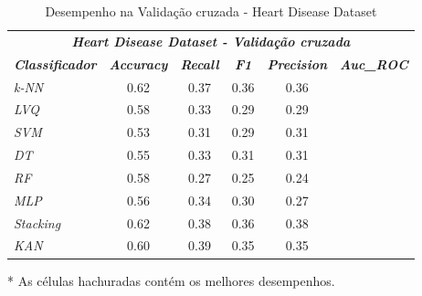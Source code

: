 \documentclass[journal]{IEEEtran}
\begin{document}
\begin{table}[h!]
	\caption{Desempenho na Validação cruzada - Heart Disease Dataset}
	\label{tab:23}
	\begin{threeparttable}
		\begin{tabular}{lccccc}
			\hline
			\multicolumn{6}{c}{\textit{\textbf{Heart Disease Dataset - Validação cruzada}}}                                                                                                                 \\
			\multicolumn{1}{l|}{\textit{\textbf{Classificador}}} & \textit{\textbf{Accuracy}} & \textit{\textbf{Recall}}  & \textit{\textbf{F1}} & \textit{\textbf{Precision}} & \textit{\textbf{Auc\_ROC}} \\ \hline
			\multicolumn{1}{l|}{\textit{k-NN}}                   & \cellcolor{lightgray}0.62  & 0.37                      & 0.36                 & 0.36                        &                            \\
			\multicolumn{1}{l|}{\textit{LVQ}}                    & 0.58                       & 0.33                      & 0.29                 & 0.29                        &                            \\
			\multicolumn{1}{l|}{\textit{SVM}}                    & 0.53                       & 0.31                      & 0.29                 & 0.31                        &                            \\
			\multicolumn{1}{l|}{\textit{DT}}                     & 0.55                       & 0.33                      & 0.31                 & 0.31                        &                            \\
			\multicolumn{1}{l|}{\textit{RF}}                     & 0.58                       & 0.27                      & 0.25                 & 0.24                        &                            \\
			\multicolumn{1}{l|}{\textit{MLP}}                    & 0.56                       & 0.34                      & 0.30                 & 0.27                        &                            \\
			\multicolumn{1}{l|}{\textit{Stacking}}               & \cellcolor{lightgray}0.62  & 0.38                      & 0.36                 & \cellcolor{lightgray}0.38   &                            \\
			\multicolumn{1}{l|}{\textit{KAN}}                    & 0.60                       & \cellcolor{lightgray}0.39 & 0.35                 & 0.35                        &                            \\
			\hline
		\end{tabular}
		\begin{tablenotes}\footnotesize
			\item[*] As células hachuradas contém os melhores desempenhos.
		\end{tablenotes}
	\end{threeparttable}
\end{table}
\end{document}
